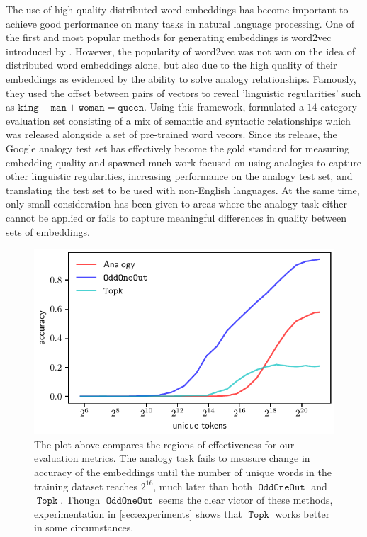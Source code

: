 \documentclass[11pt,a4paper]{article}
\DeclareMathOperator{\OddOneOut}{\texttt{OddOneOut}}
\DeclareMathOperator{\topk}{\texttt{Topk}}
\begin{document}

The use of high quality distributed word embeddings has become important to achieve good performance on many tasks in natural language processing. One of the first and most popular methods for generating embeddings is word2vec introduced by \cite{mikolov2013efficient}.
 However, the popularity of word2vec was not won on the idea of distributed word embeddings alone, but also due to the high quality of their embeddings as evidenced by the ability to solve analogy relationships.
  Famously, they used the offset between pairs of vectors to reveal 'linguistic regularities' such as $\texttt{king} - \texttt{man} + \texttt{woman} = \texttt{queen}$. 
  Using this framework, \cite{mikolov2013efficient} formulated a $14$ category evaluation set consisting of a mix of semantic and syntactic relationships which was released alongside a set of pre-trained word vecors. 
  Since its release, the Google analogy test set has effectively become the gold standard for measuring embedding quality and spawned much work focused on using analogies to capture other linguistic regularities, increasing performance on the analogy test set, and translating the test set to be used with non-English languages. 
  At the same time, only small consideration has been given to areas where the analogy task either cannot be applied or fails to capture meaningful differences in quality between sets of embeddings.

\begin{figure}
\centering
\includegraphics[width=1\columnwidth]{size_vs_acc.pdf} 
\caption{The plot above compares the regions of effectiveness for our evaluation metrics. 
The analogy task fails to measure change in accuracy of the embeddings until the number of unique words in the training dataset reaches  $2^{16}$, much later than both $\OddOneOut$ and $\topk$. 
Though $\OddOneOut$ seems the clear victor of these methods, experimentation in \ref{sec:experiments} shows that $\topk$ works better in some circumstances.}
\label{fig:data_vs_methods}
\end{figure}
\end{document}

